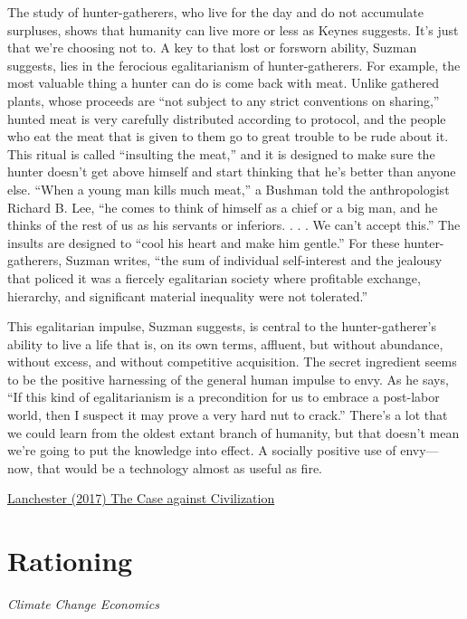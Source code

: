 \documentclass[
]{book}
\begin{document}
The study of hunter-gatherers, who live for the day and do not accumulate surpluses, shows that humanity can live more or less as Keynes suggests. It's just that we're choosing not to. A key to that lost or forsworn ability, Suzman suggests, lies in the ferocious egalitarianism of hunter-gatherers. For example, the most valuable thing a hunter can do is come back with meat. Unlike gathered plants, whose proceeds are ``not subject to any strict conventions on sharing,'' hunted meat is very carefully distributed according to protocol, and the people who eat the meat that is given to them go to great trouble to be rude about it. This ritual is called ``insulting the meat,'' and it is designed to make sure the hunter doesn't get above himself and start thinking that he's better than anyone else. ``When a young man kills much meat,'' a Bushman told the anthropologist Richard B. Lee, ``he comes to think of himself as a chief or a big man, and he thinks of the rest of us as his servants or inferiors. . . . We can't accept this.'' The insults are designed to ``cool his heart and make him gentle.'' For these hunter-gatherers, Suzman writes, ``the sum of individual self-interest and the jealousy that policed it was a fiercely egalitarian society where profitable exchange, hierarchy, and significant material inequality were not tolerated.''

This egalitarian impulse, Suzman suggests, is central to the hunter-gatherer's ability to live a life that is, on its own terms, affluent, but without abundance, without excess, and without competitive acquisition. The secret ingredient seems to be the positive harnessing of the general human impulse to envy. As he says, ``If this kind of egalitarianism is a precondition for us to embrace a post-labor world, then I suspect it may prove a very hard nut to crack.'' There's a lot that we could learn from the oldest extant branch of humanity, but that doesn't mean we're going to put the knowledge into effect. A socially positive use of envy---now, that would be a technology almost as useful as fire.

\href{https://www.newyorker.com/magazine/2017/09/18/the-case-against-civilization}{Lanchester (2017) The Case against Civilization}

\hypertarget{rationing}{%
\chapter{Rationing}\label{rationing}}

\emph{Climate Change Economics}
\end{document}
